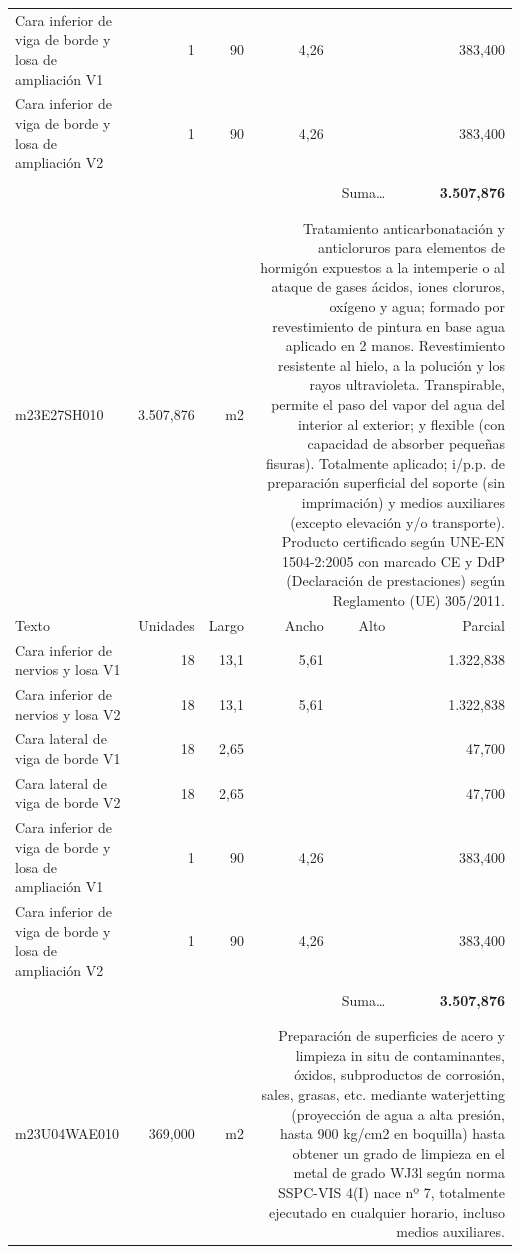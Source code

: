 \documentclass{book}%
\begin{document}
\begin{longtable}{lrrrrr}
\multicolumn{1}{p{3.5cm}}{Cara inferior de viga de borde y losa de ampliación V1}&1&90&4,26&&   383,400\\%
\multicolumn{1}{p{3.5cm}}{Cara inferior de viga de borde y losa de ampliación V2}&1&90&4,26&&   383,400\\%
&&&&&\\%
\multicolumn{5}{r}{Suma\ldots}&\textbf{ 3.507,876}\\%
\hline%
&&&&&\\%
&&&&&\\%
m23E27SH010& 3.507,876& m2&\multicolumn{3}{p{6cm}}{\scriptsize Tratamiento anticarbonatación y anticloruros para elementos de hormigón expuestos a la intemperie o al ataque de gases ácidos, iones cloruros, oxígeno y agua; formado por revestimiento de pintura en base agua aplicado en 2 manos. Revestimiento resistente al hielo, a la polución y los rayos ultravioleta. Transpirable, permite el paso del vapor del agua del interior al exterior; y flexible (con capacidad de absorber pequeñas fisuras). Totalmente aplicado; i/p.p. de preparación superficial del soporte (sin imprimación) y medios auxiliares (excepto elevación y/o transporte). Producto certificado según UNE-EN 1504-2:2005 con marcado CE y DdP (Declaración de prestaciones) según Reglamento (UE) 305/2011.\normalsize}\\%
Texto&Unidades&Largo&Ancho&Alto&Parcial\\%
\hline%
\multicolumn{1}{p{3.5cm}}{Cara inferior de nervios y losa V1}&18&13,1&5,61&& 1.322,838\\%
\multicolumn{1}{p{3.5cm}}{Cara inferior de nervios y losa V2}&18&13,1&5,61&& 1.322,838\\%
\multicolumn{1}{p{3.5cm}}{Cara lateral de viga de borde V1}&18&2,65&&&    47,700\\%
\multicolumn{1}{p{3.5cm}}{Cara lateral de viga de borde V2}&18&2,65&&&    47,700\\%
\multicolumn{1}{p{3.5cm}}{Cara inferior de viga de borde y losa de ampliación V1}&1&90&4,26&&   383,400\\%
\multicolumn{1}{p{3.5cm}}{Cara inferior de viga de borde y losa de ampliación V2}&1&90&4,26&&   383,400\\%
&&&&&\\%
\multicolumn{5}{r}{Suma\ldots}&\textbf{ 3.507,876}\\%
\hline%
&&&&&\\%
&&&&&\\%
m23U04WAE010&   369,000& m2&\multicolumn{3}{p{6cm}}{\scriptsize Preparación de superficies de acero y limpieza in situ de contaminantes, óxidos, subproductos de corrosión, sales, grasas, etc. mediante waterjetting (proyección de agua a alta presión, hasta 900 kg/cm2 en boquilla) hasta obtener un grado de limpieza en el metal de grado WJ3l según norma SSPC-VIS 4(I) nace nº 7, totalmente ejecutado en cualquier horario, incluso medios auxiliares.\normalsize}\\%

\end{longtable}
\end{document}

